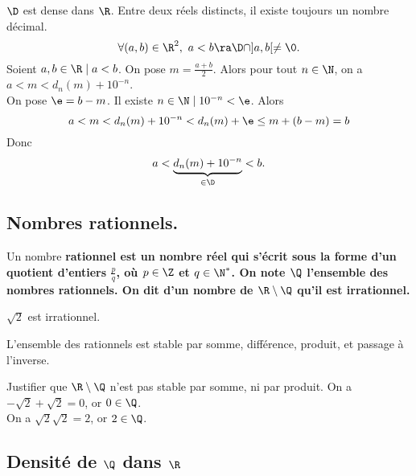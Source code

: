 \documentclass[11pt]{article}
\begin{document}
\begin{corr}{$\D$ est dense dans $\R$.}{}
    Entre deux réels distincts, il existe toujours un nombre décimal.
    \begin{equation*}
        \forall (a,b)\in\R^2,~a<b\ra \D\cap]a,b[\neq\0.
    \end{equation*}
    \tcblower
    Soient $a,b\in\R\mid a<b$. On pose $m=\frac{a+b}{2}$. Alors pour tout $n\in\N$, on a $a<m<d_n(m)+10^{-n}$.\\
    On pose $\e=b-m$. Il existe $n\in\N\mid10^{-n}<\e$. Alors
    \begin{equation*}
        a<m<d_n(m)+10^{-n}<d_n(m)+\e\leq m+(b-m)=b
    \end{equation*}
    Donc
    \begin{equation*}
        a<\underbrace{d_n(m)+10^{-n}}_{\in\D}<b.
    \end{equation*}
\end{corr}

\subsection{Nombres rationnels.}

\begin{defi}{}{}
    Un nombre \bf{rationnel} est un nombre réel qui s'écrit sous la forme d'un quotient d'entiers $\frac{p}{q}$, où $p\in\Z$ et $q\in\N^*$. On note $\Q$ l'ensemble des nombres rationnels.\n
    On dit d'un nombre de $\R\setminus\Q$ qu'il est \bf{irrationnel}.
\end{defi}

\begin{prop}{}{}
    $\sqrt{2}$ est irrationnel.
\end{prop}

\begin{prop}{}{}
    L'ensemble des rationnels est stable par somme, différence, produit, et passage à l'inverse.
\end{prop}

\pagebreak

\begin{ex}{}{}
    Justifier que $\R\setminus\Q$ n'est pas stable par somme, ni par produit.
    \tcblower
    On a $-\sqrt{2}+\sqrt{2}=0$, or $0\in\Q$.\\
    On a $\sqrt{2}\sqrt{2}=2$, or $2\in\Q$.
\end{ex}

\subsection{Densité de \texorpdfstring{$\Q$}{Lg} dans \texorpdfstring{$\R$}{Lg}}
\end{document}

